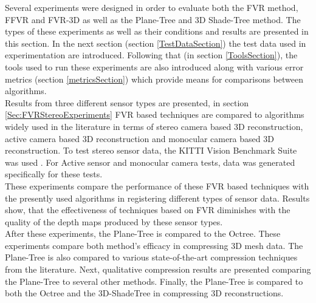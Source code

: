 Several experiments were designed in order to evaluate both the FVR method, FFVR and FVR-3D as well as the Plane-Tree and 3D Shade-Tree method. The types of these experiments as well as their conditions and results are presented in this section. In the next section (section \ref{TestDataSection}) the test data used in experimentation are introduced. Following that (in section \ref{ToolsSection}), the tools used to run these experiments are also introduced along with various error metrics (section \ref{metricsSection}) which provide means for comparisons between algorithms. \\

Results from three different sensor types are presented, in section \ref{Sec:FVRStereoExperiments} FVR based techniques are compared to algorithms widely used in the literature in terms of stereo camera based 3D reconstruction, active camera based 3D reconstruction and monocular camera based 3D reconstruction. To test stereo sensor data, the KITTI Vision Benchmark Suite was used \cite{Geiger13Vision}. For Active sensor and monocular camera tests, data was generated specifically for these tests. \\

These experiments compare the performance of these FVR based techniques with the presently used algorithms in registering different types of sensor data. Results show, that the effectiveness of techniques based on FVR diminishes with the quality of the depth maps produced by these sensor types. \\

After these experiments, the Plane-Tree is compared to the Octree. These experiments compare both method's efficacy in compressing 3D mesh data. The Plane-Tree is also compared to various state-of-the-art compression techniques from the literature. Next, qualitative compression results are presented comparing the Plane-Tree to several other methods. Finally, the Plane-Tree is compared to both the Octree and the 3D-ShadeTree in compressing 3D reconstructions. \\
